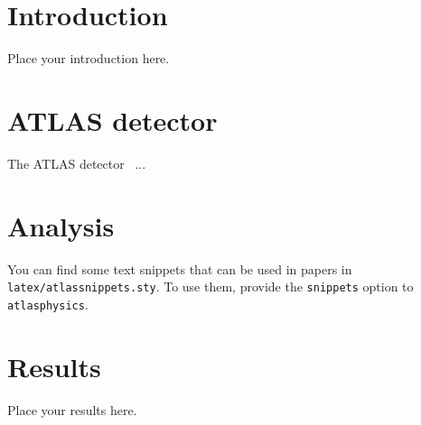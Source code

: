 \documentclass[PAPER, atlasdraft=true, texlive=2017, UKenglish]{\ATLASLATEXPATH atlasdoc}
\begin{document}
\maketitle

\tableofcontents


\section{Introduction}
\label{sec:intro}

Place your introduction here.


\section{ATLAS detector}
\label{sec:detector}

The ATLAS detector~\cite{PERF-2007-01} ...
% 


\section{Analysis}
\label{sec:analysis}

You can find some text snippets that can be used in papers in \texttt{latex/atlassnippets.sty}.
To use them, provide the \texttt{snippets} option to \texttt{atlasphysics}.


\section{Results}
\label{sec:result}

Place your results here.



\end{document}

